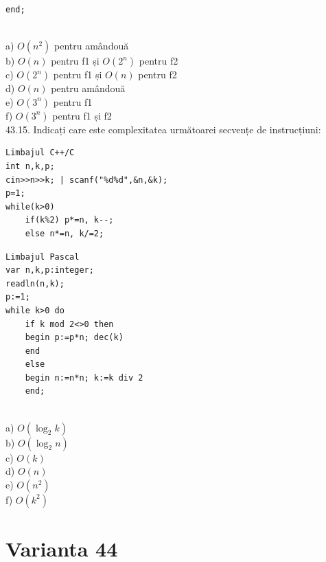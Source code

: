 \begin{itemize}
\begin{enumerate}
\begin{verbatim}
end;
\end{verbatim}
\\
a) $O(n^{2})$ pentru amândouă
\\
b) $O(n)$ pentru f1 și $O(2^{n})$ pentru f2
\\
c) $O(2^{n})$ pentru f1 și $O(n)$ pentru f2
\\
d) $O(n)$ pentru amândouă
\\
e) $O(3^{n})$ pentru f1
\\
f) $O(3^{n})$ pentru f1 și f2
\\
43.15. Indicați care este complexitatea următoarei secvențe de instrucțiuni:
\begin{verbatim}
Limbajul C++/C
int n,k,p;
cin>>n>>k; | scanf("%d%d",&n,&k);
p=1;
while(k>0)
    if(k%2) p*=n, k--;
    else n*=n, k/=2;
\end{verbatim}
\begin{verbatim}
Limbajul Pascal
var n,k,p:integer;
readln(n,k);
p:=1;
while k>0 do
    if k mod 2<>0 then
    begin p:=p*n; dec(k)
    end
    else
    begin n:=n*n; k:=k div 2
    end;
\end{verbatim}
\\
a) $O(\log _{2} k)$
\\
b) $O(\log _{2} n)$
\\
c) $O(k)$
\\
d) $O(n)$
\\
e) $O(n^{2})$
\\
f) $O(k^{2})$
\\

\section*{Varianta 44}


\end{enumerate}
\end{itemize}
